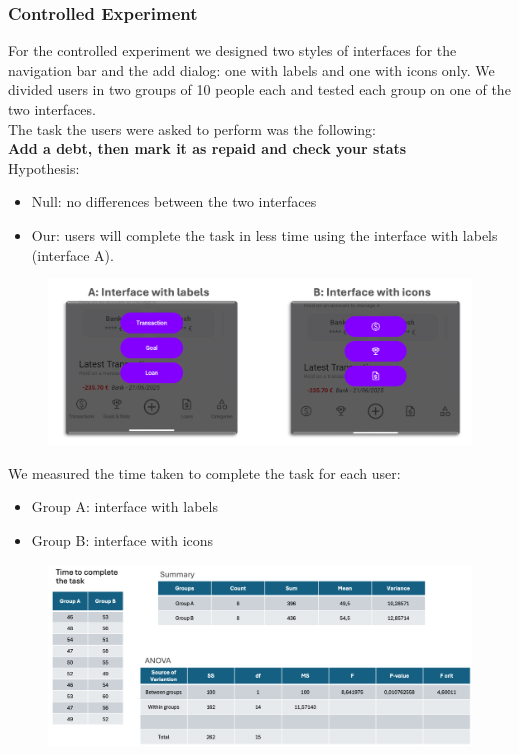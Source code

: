 \documentclass[a4paper,12pt]{article}
\begin{document}
\subsubsection{Controlled Experiment}
For the controlled experiment we designed two styles of interfaces for the navigation bar and the add dialog: one with labels and one with icons only. 
We divided users in two groups of 10 people each and tested each group on one of the two interfaces.\\The task the users were asked to perform was the following:
\vspace{0.5cm}\\
\textbf{Add a debt, then mark it as repaid and check your stats}
\vspace{0.5cm}\\
Hypothesis:
\begin{itemize}
    \item Null: no differences between the two interfaces
    \item Our: users will complete the task in less time using the interface with
    labels (interface A).
\end{itemize}
\begin{figure}[H]
    \centering
    \includegraphics[width=\linewidth]{interf.png}
\end{figure}
We measured the time taken to complete the task for each user:
\begin{itemize}
    \item Group A: interface with labels
    \item Group B: interface with icons
\end{itemize}
\begin{figure}[H]
    \centering
    \includegraphics[width=\linewidth]{ANOVA.png}
\end{figure}
\end{document}
